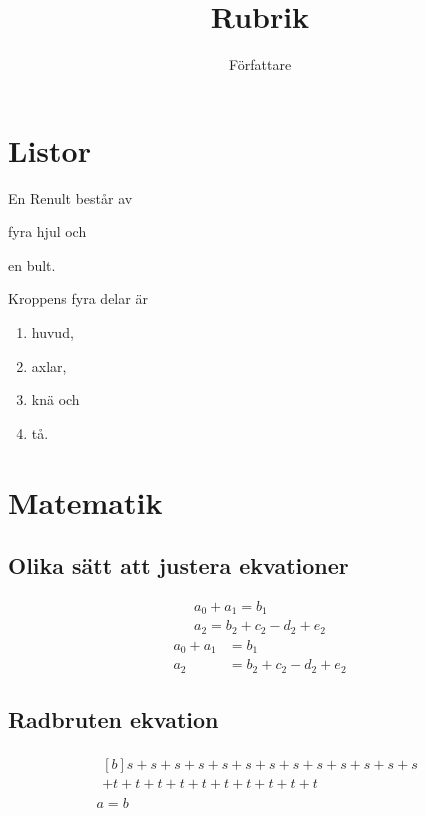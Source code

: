 \documentclass[a4paper, article, oneside, leqno]{memoir}
\title{Rubrik}
\author{Författare}
\begin{document}
\maketitle

\chapter{Listor}

En Renult består av
\begin{enumerate*}[label=(\alph*)]
\item fyra hjul och
\item en bult.
\end{enumerate*}
Kroppens fyra delar är
\begin{enumerate}
\item huvud,
\item axlar,
\item knä och
\item tå.
\end{enumerate}

\chapter{Matematik}

\section{Olika sätt att justera ekvationer}
\begin{gather}
  a_0+a_1=b_1\\
  a_2=b_2+c_2-d_2+e_2
\end{gather}
\begin{align}
  a_0+a_1&=b_1\\
  a_2&=b_2+c_2-d_2+e_2
\end{align}
\section{Radbruten ekvation}
\begin{gather}
  \begin{multlined}[b]
    s+s+s+s+s+s+s+s+s+s+s+s+s\\
    +t+t+t+t+t+t+t+t+t+t
  \end{multlined}\\
  a=b
\end{gather}
\end{document}
